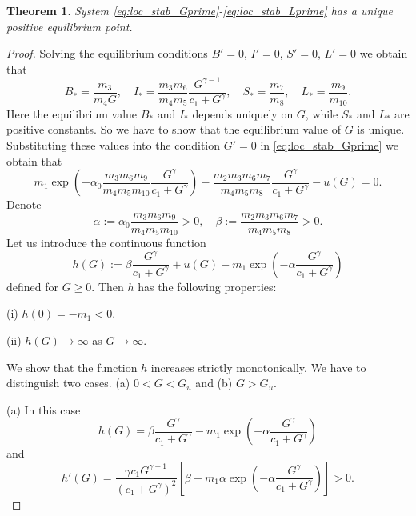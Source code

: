 \documentclass[pdflatex,sn-mathphys-num]{sn-jnl}
\theoremstyle{thmstyleone}
\newtheorem{theorem}{Theorem}[section]
\theoremstyle{thmstyletwo}
\theoremstyle{thmstylethree}
\begin{document}
\begin{theorem}
System \eqref{eq:loc_stab_Gprime}-\eqref{eq:loc_stab_Lprime} has a unique positive equilibrium point. 
\end{theorem}
\begin{proof}
Solving the equilibrium conditions $B'=0$, $I'=0$, $S'=0$, $L'=0$ we obtain that 
\begin{equation}\label{eq:equi_value}
B_{*}=\frac{m_3}{m_4 G},\quad I_{*}=\frac{m_3 m_6}{m_4 m_5}\frac{G^{\gamma -1}}{c_1+G^{\gamma}},
\quad S_{*}=\frac{m_7}{m_8}, \quad L_{*}=\frac{m_9}{m_{10}}.
\end{equation}
Here the equilibrium value $B_{*}$ and $I_{*}$ depends uniquely on $G$, while 
$S_{*}$ and $L_{*}$ are positive 
constants. So we have to show that the equilibrium value of $G$ is unique. Substituting these values 
into the condition $G'=0$ in \eqref{eq:loc_stab_Gprime} we obtain that 
\begin{equation}
m_1 \exp\left(-\alpha_0\frac{m_3 m_6 m_9}{m_4 m_5 m_{10}}\frac{G^{\gamma}}{c_1+G^{\gamma}} \right) 
-\frac{m_2 m_3 m_6 m_7}{m_4 m_5 m_8}\frac{G^{\gamma}}{c_1+G^{\gamma}}-u(G)=0.
\end{equation}
Denote
\begin{equation}
\alpha:=\alpha_0\frac{m_3 m_6 m_9}{m_4 m_5 m_{10}}>0,\quad \beta:=\frac{m_2 m_3 m_6 m_7}{m_4 m_5 m_8}>0.
\end{equation}
Let us introduce the continuous function
\begin{equation}\label{eq:h_function}
h(G):=\beta\frac{G^{\gamma}}{c_1+G^{\gamma}}+u(G)-m_1\exp\left(-\alpha \frac{G^{\gamma}}{c_1+G^{\gamma}}  \right)
\end{equation}
defined for $G\geq 0$. Then $h$ has the following properties:

(i) $h(0)=-m_1<0$.

(ii) $h(G)\to\infty$ as $G\to\infty$.

We show that the function $h$ increases strictly monotonically.
We have to distinguish two cases. 
(a) $0< G< G_u$ and (b) $G> G_u$.

(a) In this case 
\begin{equation}
h(G)=\beta\frac{G^{\gamma}}{c_1+G^{\gamma}}-m_1\exp\left(-\alpha \frac{G^{\gamma}}{c_1+G^{\gamma}}  \right)
\end{equation}
and
\begin{equation}
h'(G) = \frac{\gamma c_1 G^{\gamma-1}}{(c_1 + G^{\gamma})^2} \left[ \beta + m_1 \alpha \exp\left(-\alpha \frac{G^{\gamma}}{c_1 + G^{\gamma}}\right) \right]>0.
\end{equation}


\end{proof}
\end{document}
